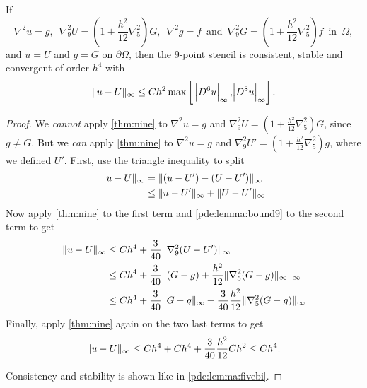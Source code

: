 \begin{theorem}
If 
$$ \nabla^2 u = g, \,\,\, \nabla_9^2 U = \left( 1+\frac{h^2}{12} \nabla_5^2 \right) G, \,\,\, \nabla^2 g = f \,\,\, \text{and} \,\,\, \nabla_9^2 G = \left( 1+\frac{h^2}{12} \nabla_5^2 \right) f \,\,\, \text{in} \,\,\, \Omega,$$
and $u=U$ and $g=G$ on $\partial \Omega$,
then the $9$-point stencil is consistent, stable and convergent of order $h^4$ with
\begin{equation*}
	\inorm{u-U} \leq Ch^2 \max \left[ \abs{D^6 u}_\infty, \abs{D^8 u}_\infty \right].
\end{equation*}
\end{theorem}
\begin{proof}
We \emph{cannot} apply \cref{thm:nine} to $\nabla^2 u = g$ and $\nabla_9^2 U = (1 + \frac{h^2}{12} \nabla_5^2) G$, since $g \neq G$.
But we \emph{can} apply \cref{thm:nine} to $\nabla^2 u = g$ and $\nabla_9^2 U' = (1 + \frac{h^2}{12} \nabla_5^2) g$, where we defined $U'$.
First, use the triangle inequality to split
\begin{equation*}
\begin{split}
	\lVert u-U \rVert_\infty &=    \lVert (u-U') - (U-U') \rVert_\infty \\
                &\leq \lVert u-U' \rVert_\infty + \lVert U-U' \rVert_\infty \\
\end{split}
\end{equation*}
Now apply \cref{thm:nine} to the first term and \cref{pde:lemma:bound9} to the second term to get
\begin{equation*}
\begin{split}
	\lVert u-U \rVert_\infty &\leq Ch^4 + \frac{3}{40} \lVert \nabla_9^2(U-U') \rVert_\infty \\
				&\leq Ch^4 + \frac{3}{40} \lVert (G-g)+\frac{h^2}{12} \lVert \nabla_5^2 (G-g) \rVert_\infty \rVert_\infty\\
				&\leq Ch^4 + \frac{3}{40} \lVert G-g \rVert_\infty + \frac{3}{40} \frac{h^2}{12} \lVert \nabla_5^2 (G-g) \rVert_\infty \\
\end{split}
\end{equation*}
Finally, apply \cref{thm:nine} again on the two last terms to get
\begin{equation*}
\begin{split}
	\lVert u-U \rVert_\infty \leq Ch^4 + Ch^4 + \frac{3}{40} \frac{h^2}{12} Ch^2 \leq Ch^4.
\end{split}
\end{equation*}

Consistency and stability is shown like in \cref{pde:lemma:fivebi}.
\end{proof}

